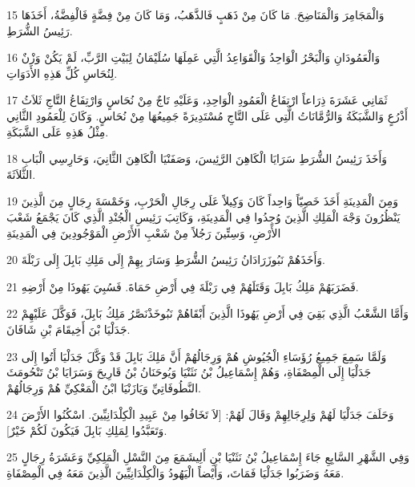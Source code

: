 \par 15 وَالْمَجَامِرَ وَالْمَنَاضِحَ. مَا كَانَ مِنْ ذَهَبٍ فَالذَّهَبُ، وَمَا كَانَ مِنْ فِضَّةٍ فَالْفِضَّةُ، أَخَذَهَا رَئِيسُ الشُّرَطِ.
\par 16 وَالْعَمُودَانِ وَالْبَحْرُ الْوَاحِدُ وَالْقَوَاعِدُ الَّتِي عَمِلَهَا سُلَيْمَانُ لِبَيْتِ الرَّبِّ، لَمْ يَكُنْ وَزْنٌ لِنُحَاسِ كُلِّ هَذِهِ الأَدَوَاتِ.
\par 17 ثَمَانِي عَشَرَةَ ذِرَاعاً ارْتِفَاعُ الْعَمُودِ الْوَاحِدِ، وَعَلَيْهِ تَاجٌ مِنْ نُحَاسٍ وَارْتِفَاعُ التَّاجِ ثَلاَثُ أَذْرُعٍ وَالشَّبَكَةُ وَالرُّمَّانَاتُ الَّتِي عَلَى التَّاجِ مُسْتَدِيرَةً جَمِيعُهَا مِنْ نُحَاسٍ. وَكَانَ لِلْعَمُودِ الثَّانِي مِثْلُ هَذِهِ عَلَى الشَّبَكَةِ.
\par 18 وَأَخَذَ رَئِيسُ الشُّرَطِ سَرَايَا الْكَاهِنَ الرَّئِيسَ، وَصَفَنْيَا الْكَاهِنَ الثَّانِيَ، وَحَارِسِي الْبَابِ الثَّلاَثَةَ.
\par 19 وَمِنَ الْمَدِينَةِ أَخَذَ خَصِيّاً وَاحِداً كَانَ وَكِيلاً عَلَى رِجَالِ الْحَرْبِ، وَخَمْسَةَ رِجَالٍ مِنَ الَّذِينَ يَنْظُرُونَ وَجْهَ الْمَلِكِ الَّذِينَ وُجِدُوا فِي الْمَدِينَةِ، وَكَاتِبَ رَئِيسِ الْجُنْدِ الَّذِي كَانَ يَجْمَعُ شَعْبَ الأَرْضِ، وَسِتِّينَ رَجُلاً مِنْ شَعْبِ الأَرْضِ الْمَوْجُودِينَ فِي الْمَدِينَةِ
\par 20 وَأَخَذَهُمْ نَبُوزَرَادَانُ رَئِيسُ الشُّرَطِ وَسَارَ بِهِمْ إِلَى مَلِكِ بَابِلَ إِلَى رَبْلَةَ.
\par 21 فَضَرَبَهُمْ مَلِكُ بَابِلَ وَقَتَلَهُمْ فِي رَبْلَةَ فِي أَرْضِ حَمَاةَ. فَسُبِيَ يَهُوذَا مِنْ أَرْضِهِ.
\par 22 وَأَمَّا الشَّعْبُ الَّذِي بَقِيَ فِي أَرْضِ يَهُوذَا الَّذِينَ أَبْقَاهُمْ نَبُوخَذْنَصَّرُ مَلِكُ بَابِلَ، فَوَكَّلَ عَلَيْهِمْ جَدَلْيَا بْنَ أَخِيقَامَ بْنِ شَافَانَ.
\par 23 وَلَمَّا سَمِعَ جَمِيعُ رُؤَسَاءِ الْجُيُوشِ هُمْ وَرِجَالُهُمْ أَنَّ مَلِكَ بَابِلَ قَدْ وَكَّلَ جَدَلْيَا أَتُوا إِلَى جَدَلْيَا إِلَى الْمِصْفَاةِ، وَهُمْ إِسْمَاعِيلُ بْنُ نَثَنْيَا وَيُوحَنَانُ بْنُ قَارِيحَ وَسَرَايَا بْنُ تَنْحُومَثَ النَّطُوفَاتِيِّ وَيَازَنْيَا ابْنُ الْمَعْكِيِّ هُمْ وَرِجَالُهُمْ.
\par 24 وَحَلَفَ جَدَلْيَا لَهُمْ وَلِرِجَالِهِمْ وَقَالَ لَهُمْ: [لاَ تَخَافُوا مِنْ عَبِيدِ الْكِلْدَانِيِّينَ. اسْكُنُوا الأَرْضَ وَتَعَبَّدُوا لِمَلِكِ بَابِلَ فَيَكُونَ لَكُمْ خَيْرٌ].
\par 25 وَفِي الشَّهْرِ السَّابِعِ جَاءَ إِسْمَاعِيلُ بْنُ نَثَنْيَا بْنِ أَلِيشَمَعَ مِنَ النَّسْلِ الْمَلِكِيِّ وَعَشَرَةُ رِجَالٍ مَعَهُ وَضَرَبُوا جَدَلْيَا فَمَاتَ، وَأَيْضاً الْيَهُودُ وَالْكِلْدَانِيِّينَ الَّذِينَ مَعَهُ فِي الْمِصْفَاةِ.
